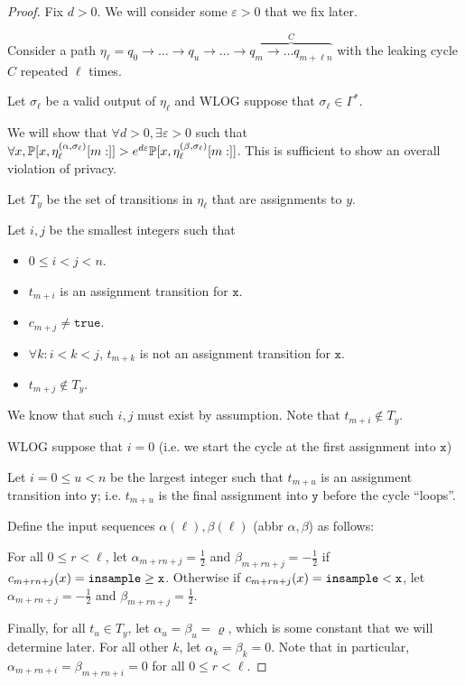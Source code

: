 \begin{proof}
	Fix $d>0$. We will consider some $\varepsilon>0$ that we fix later. 

	Consider a path $\eta_\ell = q_0\to\ldots\to q_u\to \ldots\to \overbrace{q_m\to \ldots q_{m+\ell n}}^{C}$ with the leaking cycle $C$ repeated $\ell$ times.

Let $\sigma_\ell$ be a valid output of $\eta_\ell$ and WLOG suppose that $\sigma_\ell\in\Gamma^*$. 

We will show that $\forall d>0, \exists \varepsilon>0$ such that $\forall x, \PP[x, \eta_\ell^{(\alpha, \sigma_\ell)}[m:]]>e^{d\varepsilon} \PP[x, \eta_\ell^{(\beta, \sigma_\ell)}[m:]]$. This is sufficient to show an overall violation of privacy. 

Let $T_y$ be the set of transitions in $\eta_\ell$ that are assignments to $y$. 

Let $i, j$ be the smallest integers such that \begin{itemize}
	\item $0\leq i <j<n$.
	\item $t_{m+i}$ is an assignment transition for $\texttt{x}$.
	\item $c_{m+j}\neq \texttt{true}$.
	\item $\forall k:i<k<j$, $t_{m+k}$ is not an assignment transition for $\texttt{x}$.
	\item $t_{m+j}\notin T_y$.
\end{itemize}

We know that such $i, j$ must exist by assumption. Note that $t_{m+i}\notin T_y$. 

WLOG suppose that $i=0$ (i.e. we start the cycle at the first assignment into $\texttt{x}$)

Let $i=0\leq u <n$ be the largest integer such that $t_{m+u}$ is an assignment transition into $\texttt{y}$; i.e. $t_{m+u}$ is the final assignment into $\texttt{y}$ before the cycle ``loops''. 

Define the input sequences $\alpha(\ell), \beta(\ell)$ (abbr $\alpha, \beta$) as follows: 

For all $0\leq r < \ell$, let $\alpha_{m+rn+j} = \frac{1}{2}$ and $\beta_{m+rn+j} = -\frac{1}{2}$ if $c_{m+rn+j}(x) = \gguard[\texttt{x}]$. Otherwise if $c_{m+rn+j}(x)=\lguard[\texttt{x}]$, let $\alpha_{m+rn+j}=-\frac{1}{2}$ and $\beta_{m+rn+j} =\frac{1}{2}$.
	
Finally, for all $t_u\in T_y$, let $\alpha_u = \beta_u = \varrho$, which is some constant that we will determine later. For all other $k$, let $\alpha_k=\beta_k=0$. Note that in particular, $\alpha_{m+rn+i} = \beta_{m+rn+i} = 0$ for all $0\leq r < \ell$. 


\end{proof}
